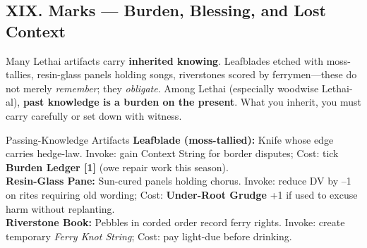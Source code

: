 \documentclass[11pt]{book}
\begin{document}
\subsection{XIX. Marks --- Burden, Blessing, and Lost Context}
Many Lethai artifacts carry \textbf{inherited knowing}. Leafblades etched with moss-tallies, resin-glass panels holding songs, riverstones scored by ferrymen---these do not merely \emph{remember}; they \emph{obligate}. Among Lethai (especially woodwise Lethai-al), \textbf{past knowledge is a burden on the present}. What you inherit, you must carry carefully or set down with witness.
\begin{atTheTable}{Passing-Knowledge Artifacts}
\textbf{Leafblade (moss-tallied):} Knife whose edge carries hedge-law. Invoke: gain Context String for border disputes; Cost: tick \textbf{Burden Ledger [1]} (owe repair work this season). \\
\textbf{Resin-Glass Pane:} Sun-cured panels holding chorus. Invoke: reduce DV by --1 on rites requiring old wording; Cost: \textbf{Under-Root Grudge} +1 if used to excuse harm without replanting. \\
\textbf{Riverstone Book:} Pebbles in corded order record ferry rights. Invoke: create temporary \emph{Ferry Knot String}; Cost: pay light-due before drinking.
\end{atTheTable}
\end{document}
